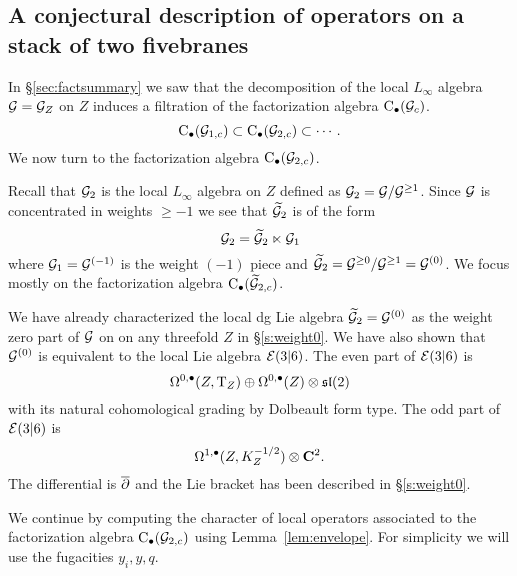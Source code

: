\subsection{A conjectural description of operators on a stack of two fivebranes}

In \S\ref{sec:factsummary} we saw that the decomposition of the local $L_\infty$ algebra $\mathcal G = \mathcal G_Z$ on $Z$ induces a filtration of the factorization algebra ${\rm C}_\bullet(\mathcal G_c)$. 
\[
{\rm C}_{\bullet}(\mathcal G_{1,c}) \subset {\rm C}_{\bullet}(\mathcal G_{2,c}) \subset \cdots .
\]
We now turn to the factorization algebra ${\rm C}_{\bullet}(\mathcal G_{2,c})$.

Recall that $\mathcal G_{2}$ is the local $L_\infty$ algebra on $Z$ defined as $\mathcal G_{2} = \mathcal G / \mathcal G^{\geq 1}$. 
Since $\mathcal G$ is concentrated in weights $\geq -1$ we see that $\widetilde {\mathcal G}_{2}$ is of the form
\[
\mathcal G_2 = \widetilde {\mathcal G}_2 \ltimes \mathcal G_1 
\]
where $\mathcal G_1 = \mathcal G^{(-1)}$ is the weight $(-1)$ piece and $\widetilde {\mathcal G}_2 = \mathcal G^{\geq 0} / \mathcal G^{\geq 1} = \mathcal G^{(0)}$.  
We focus mostly on the factorization algebra ${\rm C}_\bullet(\widetilde {\mathcal G}_{2,c})$.

We have already characterized the local dg Lie algebra $\widetilde {\mathcal G}_{2} = \mathcal G^{(0)}$ as the weight zero part of $\mathcal G$ on on any threefold $Z$ in \S\ref{s:weight0}. 
We have also shown that $\mathcal G^{(0)}$ is equivalent to the local Lie algebra $\mathcal E(3|6)$. 
The even part of $\mathcal E(3|6)$ is
\[
\Omega^{0,\bullet}(Z, {\rm T}_Z) \oplus \Omega^{0,\bullet}(Z) \otimes \mathfrak{sl}(2) 
\]
with its natural cohomological grading by Dolbeault form type. 
The odd part of $\mathcal E(3|6)$ is
\[
\Omega^{1,\bullet}(Z, K_Z^{-1/2}) \otimes \mathbf{C}^2 .
\]
The differential is $\overline{\partial}$ and the Lie bracket has been described in \S\ref{s:weight0}.


\parsec

We continue by computing the character of local operators associated to the factorization algebra ${\rm C}_\bullet(\mathcal G_{2,c})$ using Lemma~\ref{lem:envelope}.
For simplicity we will use the fugacities $y_i, y, q$.

